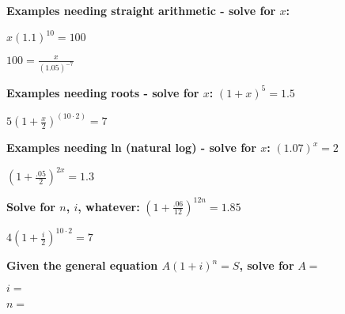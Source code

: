 \documentclass[addpoints]{exam}
\begin{document}
\textbf{Examples needing straight arithmetic - solve for $x$:}


\begin{questions}

    \question $x(1.1)^{10} = 100$
    \vspace{1in}

    \question $100 = \frac{x}{(1.05)^{-7}}$
    \vspace{1in}

    \textbf{Examples needing roots - solve for $x$:}
    \question $(1+x)^5 = 1.5$
    \vspace{1in}

    \question $5(1+\frac{x}{2})^{(10\cdot2)} = 7$
    \vspace{1in}


    \textbf{Examples needing ln (natural log) - solve for $x$:}
    \question $(1.07)^x = 2$
    \vspace{1in}

    \question $(1+\frac{.05}{2})^{2x} = 1.3$
    \vspace{1in}

    \textbf{Solve for $n$, $i$, whatever:}
    \question $(1+\frac{.06}{12})^{12n} = 1.85$
    \vspace{1in}

    \question $4(1+\frac{i}{2})^{10\cdot2} = 7$
    \vspace{1in}

    \textbf{Given the general equation $A(1+i)^n = S$, solve for}
    \question $A =$
    \vspace{.75in}

    \question $i =$
    \vspace{.75in}

    \question $n =$

\end{questions}
\end{document}
